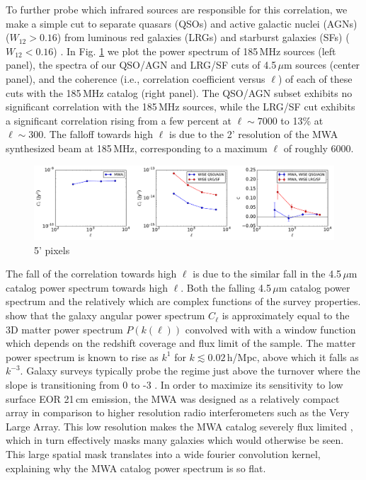 \documentclass{emulateapj}
\begin{document}
To further probe which infrared sources are responsible for this correlation, we make a simple cut to separate quasars (QSOs) and active galactic nuclei (AGNs) ($W_{12}>0.16$) from luminous red galaxies (LRGs) and starburst galaxies (SFs) ($W_{12}<0.16$) \citep{nikutta14,kurcz16}. In Fig. \ref{fig:wisexspec} we plot the power spectrum of 185\,MHz sources (left panel), the spectra of our QSO/AGN and LRG/SF cuts of 4.5\,$\mu$m sources (center panel), and the coherence (i.e., correlation coefficient versus $\ell$) of each of these cuts with the 185\,MHz catalog (right panel). The QSO/AGN subset exhibits no significant correlation with the 185\,MHz sources, while the LRG/SF cut exhibits a significant correlation rising from a few percent at $\ell\sim7000$ to 13\% at $\ell\sim300$. The falloff towards high $\ell$ is due to the 2' resolution of the MWA synthesized beam at 185\,MHz, corresponding to a maximum $\ell$ of roughly 6000. 

\begin{figure}[h]
\centering
\includegraphics[width=7in]{images/mwa_wise_qsoagn_gal_xspec.pdf}
\caption{5' pixels}
\label{fig:wisexspec}
\end{figure}


The fall of the correlation towards high $\ell$ is due to the similar fall in the 4.5\,$\mu$m catalog power spectrum towards high $\ell$. Both the falling 4.5\,$\mu$m catalog power spectrum and the relatively  which are complex functions of the survey properties. \citet{tegmark02,dodelson02} show that the galaxy angular power spectrum $C_\ell$ is approximately equal to the 3D matter power spectrum $P(k(\ell))$ convolved with with a window function which depends on the redshift coverage and flux limit of the sample. The matter power spectrum is known to rise as $k^{1}$ for $k\lesssim0.02$\,h/Mpc, above which it falls as $k^{-3}$. Galaxy surveys typically probe the regime just above the turnover where the slope is transitioning from 0 to -3 \citep{tegmark02b}. In order to maximize its sensitivity to low surface EOR 21\,cm emission, the MWA was designed as a relatively compact array in comparison to higher resolution radio interferometers such as the Very Large Array. This low resolution makes the MWA catalog severely flux limited \citep{PattiCatalog1}, which in turn effectively masks many galaxies which would otherwise be seen. This large spatial mask translates into a wide fourier convolution kernel, explaining why the MWA catalog power spectrum is so flat.
\end{document}
